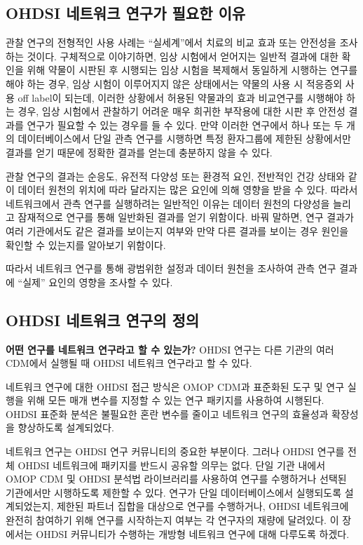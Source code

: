 \documentclass[10.5pt]{book}
\theoremstyle{definition}
\theoremstyle{definition}
\theoremstyle{definition}
\theoremstyle{remark}
\let\BeginKnitrBlock\begin \let\EndKnitrBlock\end
\begin{document}
\subsection{OHDSI 네트워크 연구가 필요한 이유}\label{ohdsi----}

관찰 연구의 전형적인 사용 사례는 ``실세계''에서 치료의 비교 효과 또는
안전성을 조사하는 것이다. 구체적으로 이야기하면, 임상 시험에서 얻어지는
일반적 결과에 대한 확인을 위해 약물이 시판된 후 시행되는 임상 시험을
복제해서 동일하게 시행하는 연구를 해야 하는 경우, 임상 시험이 이루어지지
않은 상태에서는 약물의 사용 시 적응증외 사용 off label이 되는데, 이러한
상황에서 허용된 약물과의 효과 비교연구를 시행해야 하는 경우, 임상
시험에서 관찰하기 어려운 매우 희귀한 부작용에 대한 시판 후 안전성 결과를
연구가 필요할 수 있는 경우를 들 수 있다. 만약 이러한 연구에서 하나 또는
두 개의 데이터베이스에서 단일 관측 연구를 시행하면 특정 환자그룹에
제한된 상황에서만 결과를 얻기 때문에 정확한 결과를 얻는데 충분하지 않을
수 있다.

관찰 연구의 결과는 순응도, 유전적 다양성 또는 환경적 요인, 전반적인 건강
상태와 같이 데이터 원천의 위치에 따라 달라지는 많은 요인에 의해 영향을
받을 수 있다. 따라서 네트워크에서 관측 연구를 실행하려는 일반적인 이유는
데이터 원천의 다양성을 늘리고 잠재적으로 연구를 통해 일반화된 결과를
얻기 위함이다. 바꿔 말하면, 연구 결과가 여러 기관에서도 같은 결과를
보이는지 여부와 만약 다른 결과를 보이는 경우 원인을 확인할 수 있는지를
알아보기 위함이다.

따라서 네트워크 연구를 통해 광범위한 설정과 데이터 원천을 조사하여 관측
연구 결과에 ``실제'' 요인의 영향을 조사할 수 있다.

\subsection{OHDSI 네트워크 연구의 정의}\label{ohdsi---}

\BeginKnitrBlock{rmdimportant}
\textbf{어떤 연구를 네트워크 연구라고 할 수 있는가?} OHDSI 연구는 다른
기관의 여러 CDM에서 실행될 때 OHDSI 네트워크 연구라고 할 수 있다.
\EndKnitrBlock{rmdimportant}

네트워크 연구에 대한 OHDSI 접근 방식은 OMOP CDM과 표준화된 도구 및 연구
실행을 위해 모든 매개 변수를 지정할 수 있는 연구 패키지를 사용하여
시행된다. OHDSI 표준화 분석은 불필요한 혼란 변수를 줄이고 네트워크
연구의 효율성과 확장성을 향상하도록 설계되었다.

네트워크 연구는 OHDSI 연구 커뮤니티의 중요한 부분이다. 그러나 OHDSI
연구를 전체 OHDSI 네트워크에 패키지를 반드시 공유할 의무는 없다. 단일
기관 내에서 OMOP CDM 및 OHDSI 분석법 라이브러리를 사용하여 연구를
수행하거나 선택된 기관에서만 시행하도록 제한할 수 있다. 연구가 단일
데이터베이스에서 실행되도록 설계되었는지, 제한된 파트너 집합을 대상으로
연구를 수행하거나, OHDSI 네트워크에 완전히 참여하기 위해 연구를
시작하는지 여부는 각 연구자의 재량에 달려있다. 이 장에서는 OHDSI
커뮤니티가 수행하는 개방형 네트워크 연구에 대해 다루도록 하겠다.
\end{document}
